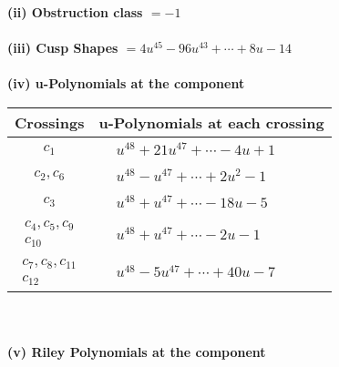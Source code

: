 \documentclass[1p]{elsarticle_modified}
\theoremstyle{definition}
\begin{document}
\flushleft \textbf{(ii) Obstruction class $= -1$}\\~\\
\flushleft \textbf{(iii) Cusp Shapes $= 4 u^{45}-96 u^{43}+\cdots+8 u-14$}\\~\\
\newpage\renewcommand{\arraystretch}{1}
\flushleft \textbf{(iv) u-Polynomials at the component}\newline \\
\begin{tabular}{m{50pt}|m{274pt}}
Crossings & \hspace{64pt}u-Polynomials at each crossing \\
\hline $$\begin{aligned}c_{1}\end{aligned}$$&$\begin{aligned}
&u^{48}+21 u^{47}+\cdots-4 u+1
\end{aligned}$\\
\hline $$\begin{aligned}c_{2},c_{6}\end{aligned}$$&$\begin{aligned}
&u^{48}- u^{47}+\cdots+2 u^2-1
\end{aligned}$\\
\hline $$\begin{aligned}c_{3}\end{aligned}$$&$\begin{aligned}
&u^{48}+u^{47}+\cdots-18 u-5
\end{aligned}$\\
\hline $$\begin{aligned}c_{4},c_{5},c_{9}\\c_{10}\end{aligned}$$&$\begin{aligned}
&u^{48}+u^{47}+\cdots-2 u-1
\end{aligned}$\\
\hline $$\begin{aligned}c_{7},c_{8},c_{11}\\c_{12}\end{aligned}$$&$\begin{aligned}
&u^{48}-5 u^{47}+\cdots+40 u-7
\end{aligned}$\\
\hline
\end{tabular}\\~\\
\newpage\renewcommand{\arraystretch}{1}
\flushleft \textbf{(v) Riley Polynomials at the component}\newline \\
\end{document}
